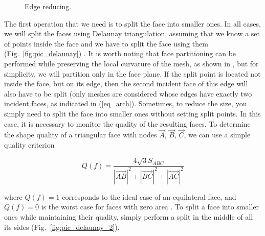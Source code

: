 \documentclass[
11pt,%
tightenlines,%
twoside,%
onecolumn,%
nofloats,%
nobibnotes,%
nofootinbib,%
superscriptaddress,%
noshowpacs,%
centertags]%
{revtex4-2}
\begin{document}
\begin{figure}[h]
\begin{minipage}[h]{0.28\textwidth}
    \caption{Edge reducing.}\label{fig:pic_reduce_edge}
  \end{minipage}
\end{figure}

The first operation that we need is to split the face into smaller ones.
In all cases, we will split the faces using Delaunay triangulation, assuming that we know a set of points inside the face and we have to split the face using them (Fig.~\ref{fig:pic_delaunay}) \cite{Rivara}.
It is worth noting that face partitioning can be performed while preserving the local curvature of the mesh, as shown in \cite{Rakotoarivelo}, but for simplicity, we will partition only in the face plane.
If the split point is located not inside the face, but on its edge, then the second incident face of this edge will also have to be split (only meshes are considered whose edges have exactly two incident faces, as indicated in (\ref{eq_arch}).
Sometimes, to reduce the size, you simply need to split the face into smaller ones without setting split points.
In this case, it is necessary to monitor the quality of the resulting faces.
To determine the shape quality of a triangular face with nodes $\vec{A}$, $\vec{B}$, $\vec{C}$, we can use a simple quality criterion

\begin{equation}
Q(f) = \frac{4\sqrt{3} S_{ABC}}{|\vec{AB}|^2 + |\vec{BC}|^2 + |\vec{AC}|^2}
\end{equation}

where $Q(f) = 1$ corresponds to the ideal case of an equilateral face, and $Q(f) = 0$ is the worst case for faces with zero area \cite{Borouchaki}.
To split a face into smaller ones while maintaining their quality, simply perform a split in the middle of all its sides (Fig.~\ref{fig:pic_delaunay_2}).
\end{document}
